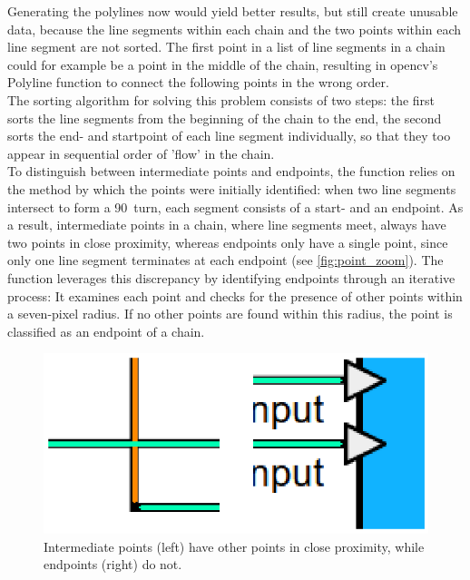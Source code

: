 Generating the polylines now would yield better results, but still create unusable data, because the line segments within each chain and the two points within each line segment are not sorted. The first point in a list of line segments in a chain could for example be a point in the middle of the chain, resulting in \acrshort{opencv}'s Polyline function to connect the following points in the wrong order.\\
The sorting algorithm for solving this problem consists of two steps: the first sorts the line segments from the beginning of the chain to the end, the second sorts the end- and startpoint of each line segment individually, so that they too appear in sequential order of 'flow' in the chain.\\
To distinguish between intermediate points and endpoints, the function relies on the method by which the points were initially identified: when two line segments intersect to form a 90\textdegree\ turn, each segment consists of a start- and an endpoint. As a result, intermediate points in a chain, where line segments meet, always have two points in close proximity, whereas endpoints only have a single point, since only one line segment terminates at each endpoint (see \autoref{fig:point_zoom}).
The function leverages this discrepancy by identifying endpoints through an iterative process: It examines each point and checks for the presence of other points within a seven-pixel radius. If no other points are found within this radius, the point is classified as an endpoint of a chain.\\
\begin{figure}
    \centering
    \includegraphics[width=0.5\linewidth]{pictures/zoomed_in_points.png}
    \caption{Intermediate points (left) have other points in close proximity, while endpoints (right) do not.}
    \label{fig:point_zoom}
\end{figure}
